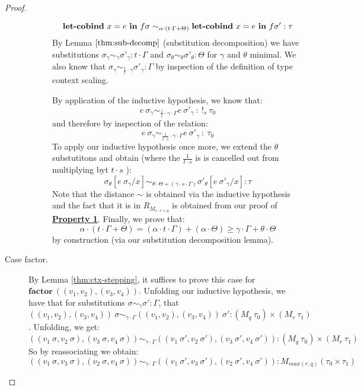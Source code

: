 \begin{proof}
\begin{description}
\begin{description}
          $$\textbf{let-cobind}~x = e \ \textbf{in} \ f \sigma \sim_{\alpha \cdot (t
          \cdot \Gamma + \Theta)} \textbf{let-cobind}~x = e \ \textbf{in} \ f \sigma' :
          \tau$$
          By Lemma $\ref{thm:sub-decomp}$ (substitution decomposition) we have
          substitutions 
          $\sigma_{\gamma} \sim_{\gamma} \sigma'_{\gamma} : t \cdot \Gamma$
          and $\sigma_{\theta} \sim_{\theta} \sigma'_{\theta} : \Theta$ for
          $\gamma$ and $\theta$ minimal. 
          We also know that 
          $\sigma_{\gamma} \sim_{\frac{1}{t} \cdot \gamma} \sigma'_{\gamma} : \Gamma$ by
          inspection of the definition of type context scaling.

          By application of the inductive hypothesis, we know that:
          $$
          e~\sigma_{\gamma} \sim_{\frac{1}{t} \cdot \gamma \cdot \Gamma}
          e~\sigma'_{\gamma} \ : \> !_{s}~\tau_0
          $$
          and therefore by inspection of the relation:
          $$
          e~\sigma_{\gamma} \sim_{\frac{1}{t \cdot s} \cdot \gamma \cdot \Gamma}
          e~\sigma'_{\gamma} \ : \> \tau_0
          $$
          To apply our inductive hypothesis once more, we extend the $\theta$
          substutitons and obtain (where the $\frac{1}{t \cdot s}$ is is
          cancelled out from multiplying byt $t \cdot s$ ):
          $$\sigma_{\theta}[e~\sigma_{\gamma}/x] \sim_{\theta \cdot \Theta + (\gamma \cdot s \cdot \Gamma)}\sigma'_{\theta}[e~\sigma'_{\gamma}/x] : \tau$$
          Note that the distance $\sim$ is obtained via the inductive hypothesis
          and the fact that it is in $R_{M_{s \cdot r + q}}$ is obtained from
          our proof of \textbf{\underline{Property 1}}.
          Finally, we prove that:
          $$
          \alpha \cdot (t \cdot \Gamma + \Theta) = 
          (\alpha \cdot t \cdot \Gamma) + (\alpha \cdot \Theta)
          \geq
          \gamma \cdot \Gamma + \theta \cdot \Theta
          $$
          by construction (via our substitution decomposition lemma).
      \end{description}

    \item[Case factor.] 
      By Lemma \ref{thm:ctx-stepping}, it suffices to prove this case for 
      $\mathbf{factor}~((v_1, v_2), (v_3, v_4))$. 
      Unfolding our inductive hypothesis, we have that for substitutions
      $\sigma \sim_{\gamma} \sigma' : \Gamma$, that 
      $((v_1, v_2), (v_3, v_4))~\sigma \sim_{\gamma \cdot \Gamma} ((v_1, v_2),
      (v_3, v_4))~\sigma' : (M_q~\tau_0) \times (M_r~\tau_1)$.
      Unfolding, we get:
      $$
      ((v_1~\sigma, v_2~\sigma), (v_3~\sigma, v_4~\sigma)) \sim_{\gamma \cdot \Gamma} ((v_1~\sigma', v_2~\sigma'),
      (v_3~\sigma', v_4~\sigma')) : (M_q~\tau_0) \times (M_r~\tau_1)
      $$
      So by reassociating we obtain:
      $$
      ((v_1~\sigma, v_3~\sigma), (v_2~\sigma, v_4~\sigma)) \sim_{\gamma \cdot \Gamma} ((v_1~\sigma', v_3~\sigma'),
      (v_2~\sigma', v_4~\sigma')) : M_{max(r,q)}(\tau_0 \times \tau_1)
      $$


\end{description}
\end{proof}
